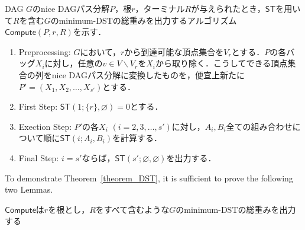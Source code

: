     



DAG $G$のnice DAGパス分解$P$，根$r$，ターミナル$R$が与えられたとき，$\mathsf{ST}$を用いて$R$を含む$G$のminimum-DSTの総重みを出力するアルゴリズム$\mathsf{Compute}(P, r, R)$を示す．


\begin{enumerate}
    \item Preprocessing: $G$において，$r$から到達可能な頂点集合を$V_r$とする．$P$の各バッグ$X_i$に対し，任意の$v \in V \backslash V_r$を$X_i$から取り除く．こうしてできる頂点集合の列をnice DAGパス分解に変換したものを，便宜上新たに$P' = (X_1, X_2, \dots , X_{s'})$とする．
    \item First Step: $\mathsf{ST}(1; \{r\}, \varnothing) = 0$とする．
    \item Exection Step: $P'$の各$X_i$ $(i=2, 3, \dots, s')$に対し，$A_i, B_i$全ての組み合わせについて順に$\mathsf{ST}(i; A_i, B_i)$を計算する．
    \item Final Step: $i = s'$ならば，$\mathsf{ST}(s'; \varnothing, \varnothing)$を出力する．
\end{enumerate}

To demonstrate Theorem~\ref{theorem_DST}, it is sufficient to prove the following two Lemmas.

\begin{lemma}\label{dst}
    $\mathsf{Compute}$は$r$を根とし，$R$をすべて含むような$G$のminimum-DSTの総重みを出力する
\end{lemma}

